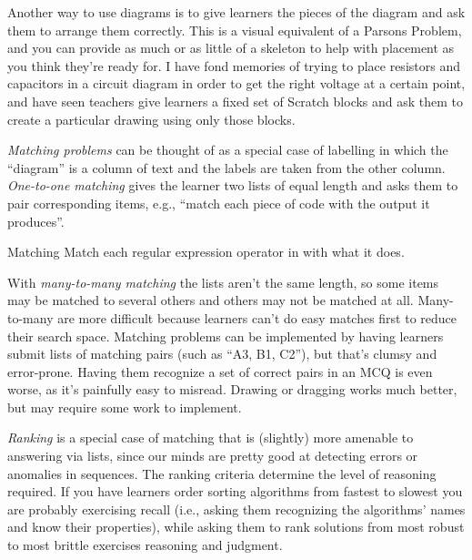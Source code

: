 
Another way to use diagrams is
to give learners the pieces of the diagram and ask them to arrange them correctly.
This is a visual equivalent of a Parsons Problem,
and you can provide as much or as little of a skeleton to help with placement
as you think they're ready for.
I have fond memories of trying to place resistors and capacitors in a circuit diagram
in order to get the right voltage at a certain point,
and have seen teachers give learners a fixed set of Scratch blocks
and ask them to create a particular drawing using only those blocks.

\emph{Matching problems} can be thought of as a special case of labelling
in which the ``diagram'' is a column of text
and the labels are taken from the other column.
\emph{One-to-one matching} gives the learner two lists of equal length
and asks them to pair corresponding items,
e.g., ``match each piece of code with the output it produces''.

\begin{aside}{Matching}
  Match each regular expression operator in 
  with what it does.
\end{aside}


With \emph{many-to-many matching} the lists aren't the same length,
so some items may be matched to several others
and others may not be matched at all.
Many-to-many are more difficult
because learners can't do easy matches first to reduce their search space.
Matching problems can be implemented by having learners submit lists of matching pairs
(such as ``A3, B1, C2''),
but that's clumsy and error-prone.
Having them recognize a set of correct pairs in an MCQ is even worse,
as it's painfully easy to misread.
Drawing or dragging works much better,
but may require some work to implement.

\emph{Ranking} is a special case of matching
that is (slightly) more amenable to answering via lists,
since our minds are pretty good at detecting errors or anomalies in sequences.
The ranking criteria determine the level of reasoning required.
If you have learners order sorting algorithms from fastest to slowest
you are probably exercising recall
(i.e., asking them recognizing the algorithms' names and know their properties),
while asking them to rank solutions from most robust to most brittle
exercises reasoning and judgment.

